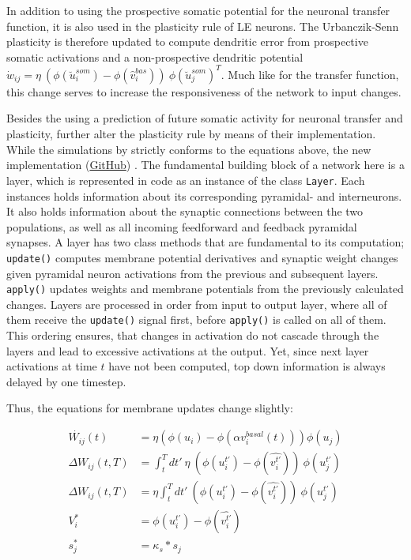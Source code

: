 In addition to using the prospective somatic potential for the neuronal transfer function, it is also used in the
plasticity rule of LE neurons. The Urbanczik-Senn plasticity is therefore updated to compute dendritic error from
prospective somatic activations and a non-prospective dendritic potential $\dot{w}_{ij}= \eta \ (
\phi(\breve{u}_i^{som}) - \phi(\hat{v}_i^{bas}) ) \ \phi(\breve{u}_j^{som})^T$. Much like for the transfer function,
this change serves to increase the responsiveness of the network to input changes. \newline


Besides the using a prediction of future somatic activity for neuronal transfer and plasticity, \cite{Haider2021}
further alter the plasticity rule by means of their implementation. While the simulations by
\cite{sacramento2018dendritic} strictly conforms to the equations above, the new implementation
(\href{https://github.com/neurips}{GitHub}) . The fundamental building block of a network here is a layer, which is
represented in code as an instance of the class \texttt{Layer}. Each instances holds information about its corresponding
pyramidal- and interneurons. It also holds information about the synaptic connections between the two populations, as
well as all incoming feedforward and feedback pyramidal synapses. A layer has two class methods that are fundamental to
its computation; \texttt{update()} computes membrane potential derivatives and synaptic weight changes given pyramidal
neuron activations from the previous and subsequent layers. \texttt{apply()} updates weights and membrane potentials
from the previously calculated changes. Layers are processed in order from input to output layer, where all of them
receive the \texttt{update()} signal first, before \texttt{apply()} is called on all of them. This ordering ensures,
that changes in activation do not cascade through the layers and lead to excessive activations at the output. Yet, since
next layer activations at time $t$ have not been computed, top down information is always delayed by one timestep.


Thus, the equations for membrane updates change slightly:

\begin{align}
  \dot{W_{ij}}(t)    & = \eta (\phi(u_i) - \phi(\alpha v^{basal}_i(t))) \phi(u_j)                             \\
  \Delta W_{ij}(t,T) & = \int_t^T dt' \ \eta \  (\phi(u_i^{t'}) - \phi(\widehat{v_i^{t'}})) \  \phi(u_j^{t'}) \\
  \Delta W_{ij}(t,T) & = \eta \int_t^T dt' \  (\phi(u_i^{t'}) - \phi(\widehat{v_i^{t'}})) \ \phi(u_j^{t'})    \\
  V_i^*              & = \phi(u_i^{t'}) - \phi(\widehat{v_i^{t'}})                                            \\
  s_j^*              & = \kappa_s * s_j
\end{align}



